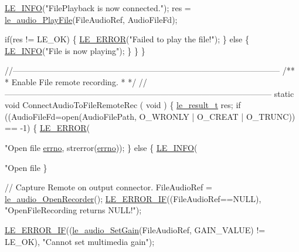 \begin{DoxyCodeInclude}
{{{        \hyperlink{le__log_8h_a23e6d206faa64f612045d688cdde5808}{LE\_INFO}(\textcolor{stringliteral}{"FilePlayback is now connected."});
        res = \hyperlink{le__audio__interface_8h_aea2c5d0b394cfab87503639c534300c9}{le\_audio\_PlayFile}(FileAudioRef, AudioFileFd);

        \textcolor{keywordflow}{if}(res != LE\_OK)
        \{
            \hyperlink{le__log_8h_a353590f91b3143a7ba3a416ae5a50c3d}{LE\_ERROR}(\textcolor{stringliteral}{"Failed to play the file!"});
        \}
        \textcolor{keywordflow}{else}
        \{
            \hyperlink{le__log_8h_a23e6d206faa64f612045d688cdde5808}{LE\_INFO}(\textcolor{stringliteral}{"File is now playing"});
        \}
    \}
\}

\textcolor{comment}{//--------------------------------------------------------------------------------------------------}\textcolor{comment}{}
\textcolor{comment}{/**}
\textcolor{comment}{ * Enable File remote recording.}
\textcolor{comment}{ *}
\textcolor{comment}{ */}
\textcolor{comment}{//--------------------------------------------------------------------------------------------------}
\textcolor{keyword}{static} \textcolor{keywordtype}{void} ConnectAudioToFileRemoteRec
(
    \textcolor{keywordtype}{void}
)
\{
    \hyperlink{le__basics_8h_a1cca095ed6ebab24b57a636382a6c86c}{le\_result\_t} res;
    \textcolor{keywordflow}{if} ((AudioFileFd=open(AudioFilePath, O\_WRONLY | O\_CREAT | O\_TRUNC)) == -1)
    \{
        \hyperlink{le__log_8h_a353590f91b3143a7ba3a416ae5a50c3d}{LE\_ERROR}(\textcolor{stringliteral}{"Open file %
      \hyperlink{supervisor_8c_a0a4ccfdbe1cf7b37afc60d34e748b066}{errno}, strerror(\hyperlink{supervisor_8c_a0a4ccfdbe1cf7b37afc60d34e748b066}{errno}));
    \}
    \textcolor{keywordflow}{else}
    \{
        \hyperlink{le__log_8h_a23e6d206faa64f612045d688cdde5808}{LE\_INFO}(\textcolor{stringliteral}{"Open file %
    \}

    \textcolor{comment}{// Capture Remote on output connector.}
    FileAudioRef = \hyperlink{le__audio__interface_8h_aeac35459c36748a4471b6d45f1ebeb24}{le\_audio\_OpenRecorder}();
    \hyperlink{le__log_8h_aceaf11a11691d6c676e36dd317b38dbd}{LE\_ERROR\_IF}((FileAudioRef==NULL), \textcolor{stringliteral}{"OpenFileRecording returns NULL!"});

    \hyperlink{le__log_8h_aceaf11a11691d6c676e36dd317b38dbd}{LE\_ERROR\_IF}((\hyperlink{le__audio__interface_8h_a65f11540e6af03a3494b6b9be76ba5fc}{le\_audio\_SetGain}(FileAudioRef, GAIN\_VALUE) != LE\_OK), \textcolor{stringliteral}{"Cannot
       set multimedia gain"});

}}}}}
\end{DoxyCodeInclude}
